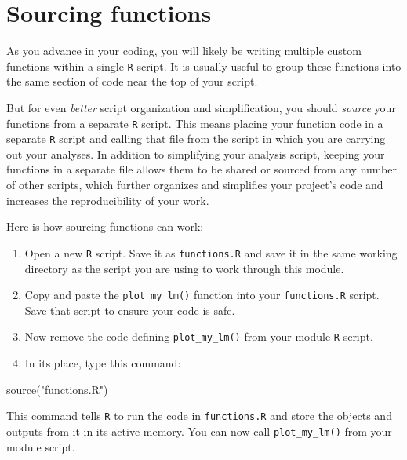\documentclass[
]{book}
\newenvironment{Shaded}{\begin{snugshade}}{\end{snugshade}}
\newcommand{\FunctionTok}[1]{\textcolor[rgb]{0.00,0.00,0.00}{#1}}
\newcommand{\NormalTok}[1]{#1}
\newcommand{\StringTok}[1]{\textcolor[rgb]{0.31,0.60,0.02}{#1}}
\begin{document}
\hypertarget{sourcing-functions}{%
\section*{Sourcing functions}\label{sourcing-functions}}

As you advance in your coding, you will likely be writing multiple custom functions within a single \texttt{R} script. It is usually useful to group these functions into the same section of code near the top of your script.

But for even \emph{better} script organization and simplification, you should \emph{source} your functions from a separate \texttt{R} script. This means placing your function code in a separate \texttt{R} script and calling that file from the script in which you are carrying out your analyses. In addition to simplifying your analysis script, keeping your functions in a separate file allows them to be shared or sourced from any number of other scripts, which further organizes and simplifies your project's code and increases the reproducibility of your work.

Here is how sourcing functions can work:

\begin{enumerate}
\def\labelenumi{\arabic{enumi}.}
\item
  Open a new \texttt{R} script. Save it as \texttt{functions.R} and save it in the same working directory as the script you are using to work through this module.
\item
  Copy and paste the \texttt{plot\_my\_lm()} function into your \texttt{functions.R} script. Save that script to ensure your code is safe.
\item
  Now remove the code defining \texttt{plot\_my\_lm()} from your module \texttt{R} script.
\item
  In its place, type this command:
\end{enumerate}

\begin{Shaded}
\begin{Highlighting}[]
\FunctionTok{source}\NormalTok{(}\StringTok{"functions.R"}\NormalTok{)}
\end{Highlighting}
\end{Shaded}

This command tells \texttt{R} to run the code in \texttt{functions.R} and store the objects and outputs from it in its active memory. You can now call \texttt{plot\_my\_lm()} from your module script.
\end{document}
